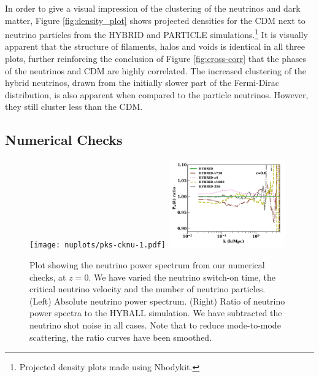 \documentclass[useAMS, usenatbib]{mnras}
\begin{document}
In order to give a visual impression of the clustering of the neutrinos and dark matter, Figure \ref{fig:density_plot} shows projected densities for the CDM next to neutrino particles from the HYBRID and PARTICLE simulations.\footnote{Projected density plots made using Nbodykit.} It is visually apparent that the structure of filaments, halos and voids is identical in all three plots, further reinforcing the conclusion of Figure \ref{fig:cross-corr} that the phases of the neutrinos and CDM are highly correlated. The increased clustering of the hybrid neutrinos, drawn from the initially slower part of the Fermi-Dirac distribution, is also apparent when compared to the particle neutrinos. However, they still cluster less than the CDM.

\subsection{Numerical Checks}

\begin{figure}
  \texttt{[image: nuplots/pks-cknu-1.pdf]}
  \includegraphics[width=0.45\textwidth]{nuplots/pks_nu_ckrel-1.pdf}
  \caption{Plot showing the neutrino power spectrum from our numerical checks, at $z=0$. We have varied the neutrino switch-on time, the critical neutrino velocity and the number of neutrino particles. (Left) Absolute neutrino power spectrum. (Right) Ratio of neutrino power spectra to the HYBALL simulation. We have subtracted the neutrino shot noise in all cases. Note that to reduce mode-to-mode scattering, the ratio curves have been smoothed.}
  \label{fig:vcrit}
\end{figure}
\end{document}

